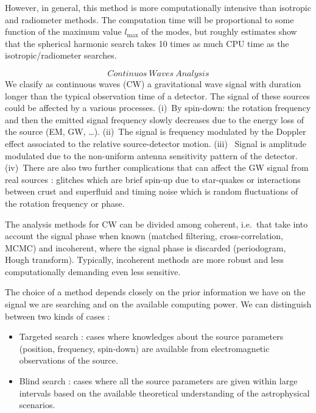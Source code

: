 However, in general,  this method is more computationally intensive than isotropic and radiometer methods.  The computation time will be proportional to some function of the maximum value $l_\text{max}$ of the modes, but roughly estimates show that the spherical harmonic search takes 10 times as much CPU time as the isotropic/radiometer searches.
    
    
    
    
{\bf \[Continuos ~Waves~ Analysis\]} We clasify as continuous waves (CW) a gravitational wave signal with duration longer than the typical observation time of a detector. The signal of these sources could be affected by a various processes. (i)~By spin-down: the rotation frequency and then the emitted signal frequency slowly decreases due to the energy loss of the source (EM, GW, \dots). (ii)~The signal is frequency modulated by the Doppler effect associated to the relative source-detector motion. (iii)~ Signal is amplitude modulated due to the non-uniform antenna sensitivity pattern of the detector.  (iv)~There are also two further complications that can affect the GW signal from real sources : glitches which are brief spin-up due to star-quakes or interactions between crust and superfluid and timing noise which is random fluctuations of the rotation frequency or phase. 

The analysis methods for CW can be divided among coherent, i.e.\  that take into account the signal phase when known (matched filtering, cross-correlation, MCMC) and incoherent, where the signal phase is discarded (periodogram,  Hough transform).
Typically, incoherent methods are more robust and less computationally demanding even less sensitive. 

The choice of a method   depends closely on the prior information we have on the signal we are searching and on the available computing power. We can distinguish between two kinds of cases : 
\begin{itemize}
\item Targeted search : cases where knowledges about the source parameters (position, frequency, spin-down) are available from electromagnetic observations of the source.
\item Blind search : cases where all the source parameters are given within large intervals based on the available theoretical understanding of the astrophysical scenarios. 
\end{itemize}

